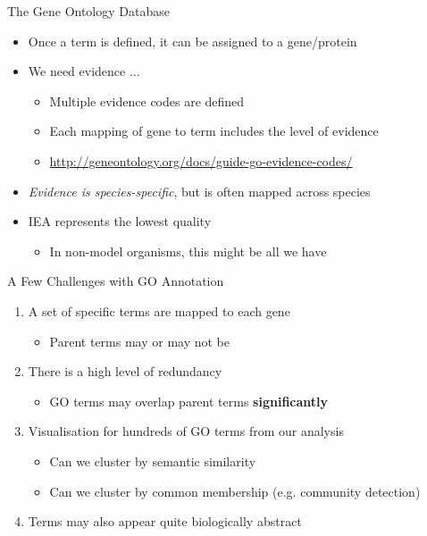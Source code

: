 \documentclass[aspectratio=169,11pt]{beamer}
\begin{document}
\begin{frame}{The Gene Ontology Database}

	\begin{itemize}
		\item Once a term is defined, it can be assigned to a gene/protein
		\item We need evidence $\ldots$
		\begin{itemize}
			\item Multiple evidence codes are defined
			\item Each mapping of gene to term includes the level of evidence
			\item \url{http://geneontology.org/docs/guide-go-evidence-codes/}
		\end{itemize}
		\pause
		\item \textit{Evidence is species-specific}, but is often mapped across species
		\item IEA represents the lowest quality
		\begin{itemize}
			\item In non-model organisms, this might be all we have
		\end{itemize}
	\end{itemize}

\end{frame}

\begin{frame}{A Few Challenges with GO Annotation}

	\begin{enumerate}
		\item A set of specific terms are mapped to each gene
		\begin{itemize}
			\item Parent terms may or may not be
		\end{itemize}
		\item There is a high level of redundancy
		\begin{itemize}
			\item GO terms may overlap parent terms \textbf{significantly}
		\end{itemize}
		\item Visualisation for hundreds of GO terms from our analysis
		\begin{itemize}
			\item Can we cluster by semantic similarity
			\item Can we cluster by common membership (e.g. community detection)
		\end{itemize}
		\item Terms may also appear quite biologically abstract
	\end{enumerate}

\end{frame}
\end{document}
